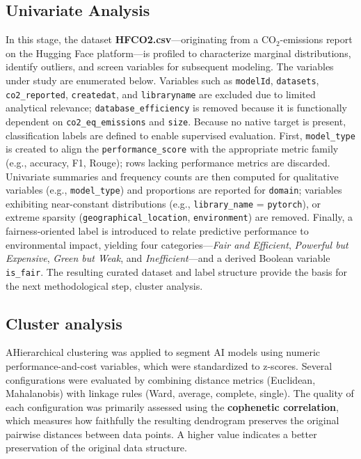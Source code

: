 \documentclass[journal]{IEEEtran}
\begin{document}
	\subsection{Univariate Analysis}
	In this stage, the dataset \textbf{HFCO2.csv}—originating from a $\text{CO}_2$-emissions report on the Hugging Face platform—is profiled to characterize marginal distributions, identify outliers, and screen variables for subsequent modeling. The variables under study are enumerated below. Variables such as \texttt{modelId}, \texttt{datasets}, \texttt{co2\_reported}, \texttt{createdat}, and \texttt{libraryname} are excluded due to limited analytical relevance; \texttt{database\_efficiency} is removed because it is functionally dependent on \texttt{co2\_eq\_emissions} and \texttt{size}.
	Because no native target is present, classification labels are defined to enable supervised evaluation. First, \texttt{model\_type} is created to align the \texttt{performance\_score} with the appropriate metric family (e.g., accuracy, F1, Rouge); rows lacking performance metrics are discarded. Univariate summaries and frequency counts are then computed for qualitative variables (e.g., \texttt{model\_type}) and proportions are reported for \texttt{domain}; variables exhibiting near-constant distributions (e.g., \texttt{library\_name} = \texttt{pytorch}), or extreme sparsity (\texttt{geographical\_location}, \texttt{environment}) are removed.
	Finally, a fairness-oriented label is introduced to relate predictive performance to environmental impact, yielding four categories—\emph{Fair and Efficient}, \emph{Powerful but Expensive}, \emph{Green but Weak}, and \emph{Inefficient}—and a derived Boolean variable \texttt{is\_fair}. The resulting curated dataset and label structure provide the basis for the next methodological step, cluster analysis.


	\subsection{Cluster analysis}
	\label{methodology:cluanal}
	AHierarchical clustering was applied to segment AI models using numeric performance-and-cost variables, which were standardized to z-scores. Several configurations were evaluated by combining distance metrics (Euclidean, Mahalanobis) with linkage rules (Ward, average, complete, single). The quality of each configuration was primarily assessed using the \textbf{cophenetic correlation}, which measures how faithfully the resulting dendrogram preserves the original pairwise distances between data points. A higher value indicates a better preservation of the original data structure.
	
\end{document}
